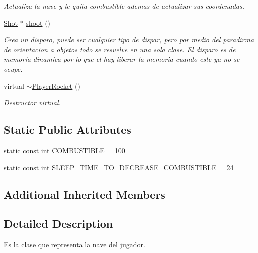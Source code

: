 \begin{DoxyCompactItemize}
\begin{DoxyCompactList}\small\item\em Actualiza la nave y le quita combustible ademas de actualizar sus coordenadas. \end{DoxyCompactList}\item 
\hyperlink{class_shot}{Shot} $\ast$ \hyperlink{class_player_rocket_a1277f01884b2b1a68e312228e916805a}{shoot} ()
\begin{DoxyCompactList}\small\item\em Crea un disparo, puede ser cualquier tipo de dispar, pero por medio del paradirma de orientacion a objetos todo se resuelve en una sola clase. El disparo es de memoria dinamica por lo que el hay liberar la memoria cuando este ya no se ocupe. \end{DoxyCompactList}\item 
\hypertarget{class_player_rocket_aa081b938fd194297b94042efa8364c23}{virtual \hyperlink{class_player_rocket_aa081b938fd194297b94042efa8364c23}{$\sim$\-Player\-Rocket} ()}\label{class_player_rocket_aa081b938fd194297b94042efa8364c23}

\begin{DoxyCompactList}\small\item\em Destructor virtual. \end{DoxyCompactList}\end{DoxyCompactItemize}
\subsection*{Static Public Attributes}
\begin{DoxyCompactItemize}
\item 
static const int \hyperlink{class_player_rocket_a6f6bd540c91552c079a394e34d25f2c8}{C\-O\-M\-B\-U\-S\-T\-I\-B\-L\-E} = 100
\item 
static const int \hyperlink{class_player_rocket_aa3f048b7f984ee944f8daeb35cc748c2}{S\-L\-E\-E\-P\-\_\-\-T\-I\-M\-E\-\_\-\-T\-O\-\_\-\-D\-E\-C\-R\-E\-A\-S\-E\-\_\-\-C\-O\-M\-B\-U\-S\-T\-I\-B\-L\-E} = 24
\end{DoxyCompactItemize}
\subsection*{Additional Inherited Members}


\subsection{Detailed Description}
Es la clase que representa la nave del jugador. 


